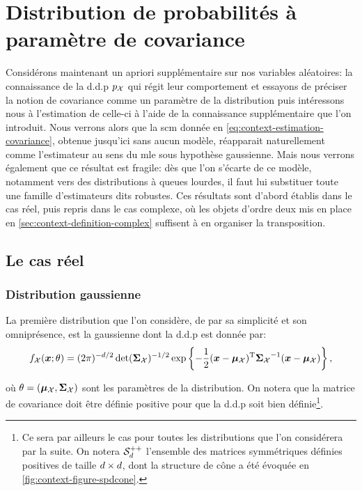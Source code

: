 \chapter{Distribution de probabilités à paramètre de covariance}
\label{ch:context-distributions}

Considérons maintenant un apriori supplémentaire sur nos variables aléatoires: la connaissance de la d.d.p $p_{\mathcal{X}}$ qui régit leur comportement et essayons de préciser la notion de covariance comme un paramètre de la distribution puis intéressons nous à l'estimation de celle-ci à l'aide de la connaissance supplémentaire que l'on introduit. Nous verrons alors que la scm donnée en \cref{eq:context-estimation-covariance}, obtenue jusqu'ici sans aucun modèle, réapparait naturellement comme l'estimateur au sens du mle sous hypothèse gaussienne. Mais nous verrons également que ce résultat est fragile: dès que l'on s'écarte de ce modèle, notamment vers des distributions à queues lourdes, il faut lui substituer toute une famille d'estimateurs dits robustes. Ces résultats sont d'abord établis dans le cas réel, puis repris dans le cas complexe, où les objets d'ordre deux mis en place en \cref{sec:context-definition-complex} suffisent à en organiser la transposition.

\section{Le cas réel}
\label{sec:context-distributions-reel}

\subsection{Distribution gaussienne}
\label{subsec:context-distributions-gaussian}

La première distribution que l'on considère, de par sa simplicité et son omniprésence, est la gaussienne dont la d.d.p est donnée par:
\begin{equation}
  f_{\mathcal{X}}(\boldsymbol{x}; \theta) = (2\pi)^{-d/2}\operatorname{\operatorname{det}}(\boldsymbol{\Sigma}_{\mathcal{X}})^{-1/2}\exp\left\{ -\frac{1}{2}(\boldsymbol{x}-\boldsymbol{\mu}_{\mathcal{X}})^{\mathrm{T}} {\boldsymbol{\Sigma}_{\mathcal{X}}}^{-1} (\boldsymbol{x}-\boldsymbol{\mu}_{\mathcal{X}}) \right\},
  \label{eq:context-definition-gaussian}
\end{equation}

où $\theta = (\boldsymbol{\mu}_{\mathcal{X}}, \boldsymbol{\Sigma}_{\mathcal{X}})$ sont les paramètres de la distribution. On notera que la matrice de covariance doit être définie positive pour que la d.d.p soit bien définie\footnote{Ce sera par ailleurs le cas pour toutes les distributions que l'on considérera par la suite. On notera $\mathcal{S}_{d}^{++}$ l'ensemble des matrices symmétriques définies positives de taille $d\times d$, dont la structure de cône a été évoquée en \cref{fig:context-figure-spdcone}.}.

